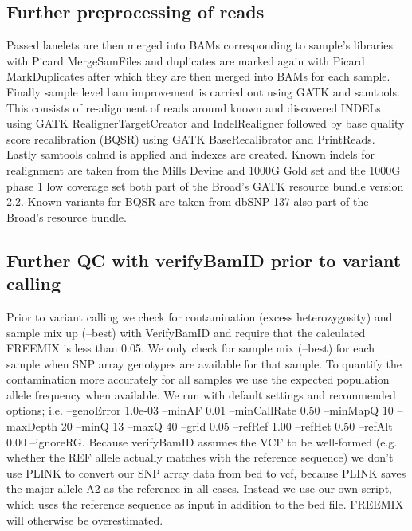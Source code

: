 \subsection{Further preprocessing of reads}
Passed lanelets are then merged into BAMs corresponding to sample’s libraries with Picard MergeSamFiles and duplicates are marked again with Picard MarkDuplicates after which they are then merged into BAMs for each sample. Finally sample level bam improvement is carried out using GATK\cite{McKenna01092010}\cite{DePristo2011} and samtools\cite{Li15082009}. This consists of re-alignment of reads around known and discovered INDELs using GATK RealignerTargetCreator and IndelRealigner followed by base quality score recalibration (BQSR) using GATK BaseRecalibrator and PrintReads. Lastly samtools calmd is applied and indexes are created. Known indels for realignment are taken from the Mills Devine and 1000G Gold set and the 1000G phase 1 low coverage set both part of the Broad’s GATK resource bundle version 2.2. Known variants for BQSR are taken from dbSNP 137 also part of the Broad’s resource bundle.

\subsection{Further QC with verifyBamID prior to variant calling}

Prior to variant calling we check for contamination (excess heterozygosity) and sample mix up (--best) with VerifyBamID and require that the calculated FREEMIX is less than 0.05. We only check for sample mix (--best) for each sample when SNP array genotypes are available for that sample. To quantify the contamination more accurately for all samples we use the expected population allele frequency when available. We run with default settings and recommended options; i.e. --genoError 1.0e-03 --minAF 0.01 --minCallRate 0.50 --minMapQ 10 --maxDepth 20 --minQ 13 --maxQ 40 --grid 0.05 --refRef 1.00 --refHet 0.50 --refAlt 0.00 --ignoreRG. Because verifyBamID assumes the VCF to be well-formed (e.g. whether the REF allele actually matches with the reference sequence) we don't use PLINK to convert our SNP array data from bed to vcf, because PLINK saves the major allele A2 as the reference in all cases. Instead we use our own script, which uses the reference sequence as input in addition to the bed file. FREEMIX will otherwise be overestimated.
